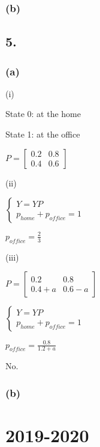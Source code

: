 \documentclass{article}
\begin{document}
\subsubsection*{(b)}

\subsection*{5.}
\subsubsection*{(a)}
(i)\par
State 0: at the home\par
State 1: at the office\par\indent
\par
$P=\begin{bmatrix}
0.2 &0.8 \\
0.4 &0.6 
\end{bmatrix}$\par\indent
\par
(ii)\par\indent
\par
$\begin{cases}
Y=YP\\
p_{home}+p_{office}=1
\end{cases}$\par\indent
\par
$p_{office}=\frac{2}{3}$\par\indent
\par
(iii)\par\indent
\par
$P=\begin{bmatrix}
0.2 &0.8 \\
0.4+a &0.6-a 
\end{bmatrix}$\par\indent
\par
$\begin{cases}
Y=YP\\
p_{home}+p_{office}=1
\end{cases}$\par\indent
\par
$p_{office}=\frac{0.8}{1.2+a}$\par
No.
\subsubsection*{(b)}

\clearpage

\section*{2019-2020}
\end{document}

